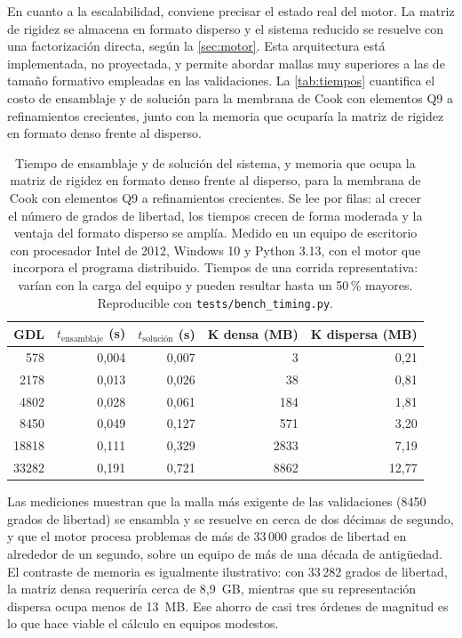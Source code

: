 En cuanto a la escalabilidad, conviene precisar el estado real del motor. La matriz de rigidez se almacena en formato disperso y el sistema reducido se resuelve con una factorización directa, según la \autoref{sec:motor}. Esta arquitectura está implementada, no proyectada, y permite abordar mallas muy superiores a las de tamaño formativo empleadas en las validaciones. La \autoref{tab:tiempos} cuantifica el costo de ensamblaje y de solución para la membrana de Cook con elementos Q9 a refinamientos crecientes, junto con la memoria que ocuparía la matriz de rigidez en formato denso frente al disperso.

\begin{table}[htbp]
\centering
\caption[Tiempos de ensamblaje y solución, y memoria de la matriz de rigidez (Cook Q9).]{Tiempo de ensamblaje y de solución del sistema, y memoria que ocupa la matriz de rigidez en formato denso frente al disperso, para la membrana de Cook con elementos Q9 a refinamientos crecientes. Se lee por filas: al crecer el número de grados de libertad, los tiempos crecen de forma moderada y la ventaja del formato disperso se amplía. Medido en un equipo de escritorio con procesador Intel de 2012, Windows 10 y Python 3.13, con el motor que incorpora el programa distribuido. Tiempos de una corrida representativa: varían con la carga del equipo y pueden resultar hasta un 50\,\% mayores. Reproducible con \texttt{tests/bench\_timing.py}.}
\label{tab:tiempos}
\begin{tabular}{r r r r r}
\hline
GDL & $t_{\text{ensamblaje}}$ (s) & $t_{\text{solución}}$ (s) & $\bm{K}$ densa (MB) & $\bm{K}$ dispersa (MB) \\
\hline
578   & 0,004 & 0,007 & 3    & 0,21  \\
2178  & 0,013 & 0,026 & 38   & 0,81  \\
4802  & 0,028 & 0,061 & 184  & 1,81  \\
8450  & 0,049 & 0,127 & 571  & 3,20  \\
18818 & 0,111 & 0,329 & 2833 & 7,19  \\
33282 & 0,191 & 0,721 & 8862 & 12,77 \\
\hline
\end{tabular}
\end{table}

Las mediciones muestran que la malla más exigente de las validaciones (8450 grados de libertad) se ensambla y se resuelve en cerca de dos décimas de segundo, y que el motor procesa problemas de más de 33\,000 grados de libertad en alrededor de un segundo, sobre un equipo de más de una década de antigüedad. El contraste de memoria es igualmente ilustrativo: con 33\,282 grados de libertad, la matriz densa requeriría cerca de 8,9~GB, mientras que su representación dispersa ocupa menos de 13~MB. Ese ahorro de casi tres órdenes de magnitud es lo que hace viable el cálculo en equipos modestos.

